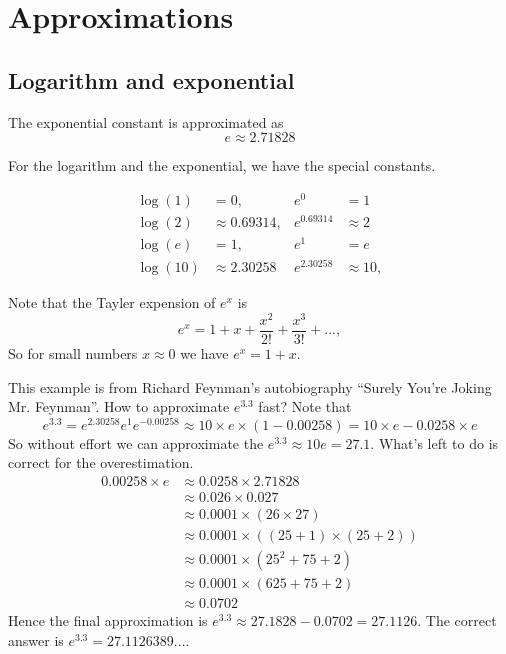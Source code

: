 \section{Approximations}


\subsection{Logarithm and exponential}

The exponential constant is approximated as
\begin{equation*}
    e \approx 2.71828
\end{equation*}

For the logarithm and the exponential, we have the special constants.

\begin{align*}
    \log(1) &= 0,               & e^0 &= 1 \\
    \log(2) &\approx 0.69314,   & e^{0.69314} &\approx 2 \\
    \log(e) &= 1,               & e^{1} &= e \\
    \log(10) &\approx 2.30258   & e^{2.30258} &\approx 10,
\end{align*}

Note that the Tayler expension of $e^x$ is
\begin{equation*}
    e^x = 1 + x + \frac{x^2}{2!} + \frac{x^3}{3!} + ...,
\end{equation*}
So for small numbers $x \approx 0$ we have $e^x = 1 + x$.

\begin{example}
    This example is from Richard Feynman's autobiography ``Surely You're Joking Mr. Feynman''.
    How to approximate $e^{3.3}$ fast?
    Note that
    \begin{equation*}
        e^{3.3} = e^{2.30258} e^{1} e^{-0.00258}
            \approx 10 \times e \times (1 - 0.00258)
            = 10 \times e - 0.0258 \times e
    \end{equation*}
    So without effort we can approximate the $e^{3.3} \approx 10 e = 27.1$.
    What's left to do is correct for the overestimation.
    \begin{equation*}
        \begin{split}
            0.00258 \times e
                &\approx 0.0258 \times 2.71828 \\
                &\approx 0.026 \times 0.027 \\
                &\approx 0.0001 \times (26 \times 27) \\
                &\approx 0.0001 \times ((25 + 1) \times (25 + 2)) \\
                &\approx 0.0001 \times (25^2 + 75 + 2) \\
                &\approx 0.0001 \times (625 + 75 + 2) \\
                &\approx 0.0702
        \end{split}
    \end{equation*}
    Hence the final approximation is $e^{3.3} \approx 27.1828 - 0.0702 = 27.1126$.
    The correct answer is $e^{3.3} = 27.1126389...$.
\end{example}
